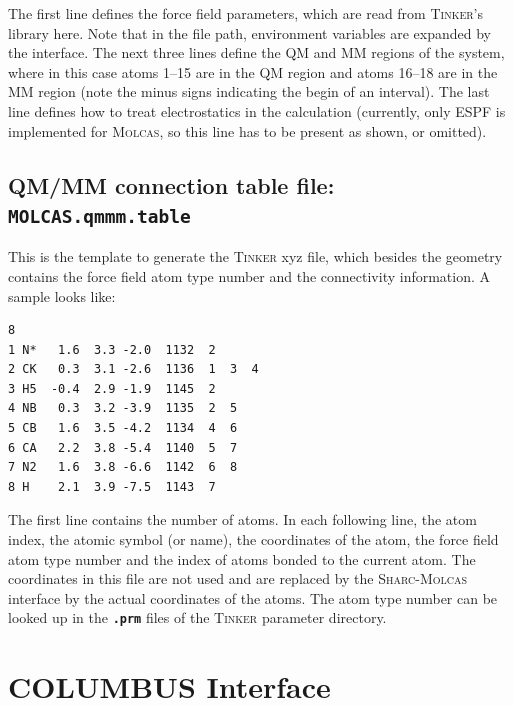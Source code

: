 \documentclass[a4paper,10pt,DIV=15,openany]{scrbook}
\newcommand{\sharc}{\textsc{Sharc}}
\newcommand{\ttt}[1]{\textbf{\texttt{#1}}}
\newenvironment{example}{
  \setlength{\OuterFrameSep}{3pt}
  \vspace{0mm}
  \definecolor{shadecolor}{HTML}{E4F4FF}
  \begin{shaded}
}{
  \end{shaded}
}
\begin{document}
The first line defines the force field parameters, which are read from \textsc{Tinker}'s library here. Note that in the file path, environment variables are expanded by the interface.
The next three lines define the QM and MM regions of the system, where in this case atoms 1--15 are in the QM region and atoms 16--18 are in the MM region (note the minus signs indicating the begin of an interval). The last line defines how to treat electrostatics in the calculation (currently, only ESPF is implemented for \textsc{Molcas}, so this line has to be present as shown, or omitted).

\subsection{QM/MM connection table file: \ttt{MOLCAS.qmmm.table}}

This is the template to generate the \textsc{Tinker} xyz file, which besides the geometry contains the force field atom type number and the connectivity information. A sample looks like:

\begin{example}
\begin{verbatim}
8
1 N*   1.6  3.3 -2.0  1132  2
2 CK   0.3  3.1 -2.6  1136  1  3  4
3 H5  -0.4  2.9 -1.9  1145  2
4 NB   0.3  3.2 -3.9  1135  2  5
5 CB   1.6  3.5 -4.2  1134  4  6
6 CA   2.2  3.8 -5.4  1140  5  7
7 N2   1.6  3.8 -6.6  1142  6  8
8 H    2.1  3.9 -7.5  1143  7
\end{verbatim}
\end{example}

The first line contains the number of atoms. In each following line, the atom index, the atomic symbol (or name), the coordinates of the atom, the force field atom type number and the index of atoms bonded to the current atom. The coordinates in this file are not used and are replaced by the \sharc-\textsc{Molcas} interface by the actual coordinates of the atoms. The atom type number can be looked up in the \ttt{.prm} files of the \textsc{Tinker} parameter directory. 







\section{COLUMBUS Interface}\label{sec:int:columbus}
\end{document}
